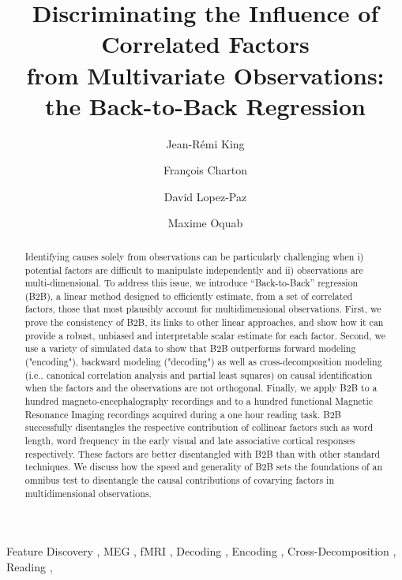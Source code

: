 \documentclass[preprint,12pt,3p]{elsarticle}
\begin{document}
\begin{frontmatter}

\title{Discriminating the Influence of Correlated Factors \\from Multivariate Observations: the Back-to-Back Regression}

\author[1,2]{Jean-Rémi King}

\author[2]{Fran\c{c}ois Charton}
\author[2]{David Lopez-Paz}
\author[2]{Maxime Oquab}
\address[1]{Laboratoire des systèmes perceptifs, PSL University, CNRS}
\address[2]{Facebook AI}


\begin{abstract}
Identifying causes solely from observations can be particularly challenging when
i) potential factors are difficult to manipulate independently and ii)
observations are multi-dimensional. To address this issue, we
introduce ``Back-to-Back'' regression (B2B), a linear method designed to efficiently
estimate, from a set of correlated factors, those that most plausibly account for
multidimensional observations. First, we prove the consistency of B2B, its links to
other linear approaches, and show how it can provide a robust, unbiased and
interpretable scalar estimate for each factor.
Second, we use a variety of simulated data to show that B2B outperforms
forward modeling ("encoding"), backward modeling ("decoding") as well as
cross-decomposition modeling (i.e.. canonical
correlation analysis and partial least squares) on causal identification when
the factors and the observations are not orthogonal.
Finally, we apply B2B to a hundred magneto-encephalography recordings and to a hundred functional Magnetic
Resonance Imaging recordings acquired during a one hour reading task. B2B successfully disentangles
the respective contribution of collinear factors such as word length, word
frequency in the early visual and late associative cortical
responses respectively. These factors are better disentangled with B2B than with
other standard techniques. We discuss how the speed and generality of B2B
sets the foundations of an omnibus test to disentangle the causal contributions of covarying
factors in multidimensional observations.
\end{abstract}


\begin{keyword}
  Feature Discovery \sep
  MEG \sep
  fMRI \sep
  Decoding \sep
  Encoding \sep
  Cross-Decomposition \sep
  Reading \sep
\end{keyword}

\end{frontmatter}
\end{document}
